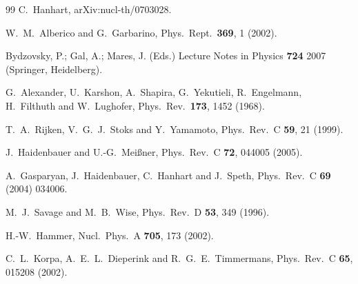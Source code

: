 \documentclass[aps,rmp,nofootinbib,twocolumn,floatfix]{revtex4}
\begin{document}
\begin{thebibliography}{99}
  C.~Hanhart,
  arXiv:nucl-th/0703028.

  W.~M.~Alberico and G.~Garbarino,
  Phys.\ Rept.\  {\bf 369}, 1 (2002).

Bydzovsky, P.; Gal, A.; Mares, J. (Eds.)
Lecture Notes in Physics  {\bf  724} 2007
(Springer, Heidelberg). 


  G.~Alexander, U.~Karshon, A.~Shapira, G.~Yekutieli, R.~Engelmann, H.~Filthuth and W.~Lughofer,
  Phys.\ Rev.\  {\bf 173}, 1452 (1968).

  T.~A.~Rijken, V.~G.~J.~Stoks and Y.~Yamamoto,
  Phys.\ Rev.\  C {\bf 59}, 21 (1999).

  J.~Haidenbauer and U.-G.~Mei{\ss}ner,
  Phys.\ Rev.\  C {\bf 72}, 044005 (2005).

  A.~Gasparyan, J.~Haidenbauer, C.~Hanhart and J.~Speth,
  Phys.\ Rev.\  C {\bf 69} (2004) 034006.

  M.~J.~Savage and M.~B.~Wise,
  Phys.\ Rev.\  D {\bf 53}, 349 (1996).

  H.-W.~Hammer,
  Nucl.\ Phys.\  A {\bf 705}, 173 (2002).

  C.~L.~Korpa, A.~E.~L.~Dieperink and R.~G.~E.~Timmermans,
  Phys.\ Rev.\  C {\bf 65}, 015208 (2002).


\end{thebibliography}
\end{document}
